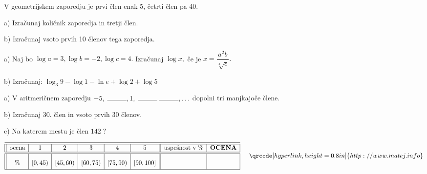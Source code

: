 \documentclass[a4paper,12pt]{letter}
\newcounter{tocke}
\begin{document}


\newpage
\def\tocke6{4+4}
\begin{naloga}[\hfill \quad $\tocke6$
\qquad \rightsquigarrow \vert a.\qquad| b.\qquad| c.\qquad| ] \addtocounter{tocke}{\tocke6}
V geometrijskem zaporedju je prvi člen enak 5, četrti člen pa 40. 

a) Izračunaj količnik zaporedja in tretji člen.

b) Izračunaj vsoto prvih 10 členov tega zaporedja.
\end{naloga}

\vspace{10cm}
\def\tocke6{4+3}
\begin{naloga}[\hfill \quad $\tocke6$
\qquad \rightsquigarrow \vert a.\qquad| b.\qquad| c.\qquad| ] \addtocounter{tocke}{\tocke6}
a) Naj bo $\log a=3, \log b=-2,\log c=4.$ Izračunaj $\log x,$ če je $x=\dfrac{a^2b}{\sqrt[4]{c}}.$

b) Izračunaj: $\log_3 9-\log 1-\ln e+\log 2+\log 5$
\end{naloga}
 



\newpage
\def\tocke3{3+4+3}
\begin{naloga}[\hfill \quad $\tocke3$
\qquad \rightsquigarrow \vert a.\qquad\vert b.\qquad] \addtocounter{tocke}{\tocke3}
a) V aritmeričnem zaporedju $-5,\;\rule{1cm}{0.1mm},1,\;\rule{1cm}{0.1mm}\;\rule{1cm}{0.1mm}, \ldots$ dopolni tri manjkajoče člene.

b) Izračunaj 30. člen in vsoto prvih 30 členov.

c) Na katerem mestu je člen $142\;?$
\end{naloga}



\vfill
{}
\begin{kriterij*}
 $$
 \begin{array}{||c|c|c|c|c|c||
>{}c|c|}
 \hline\hline
 \textup{ocena}& 1&2&3&4&5&\textrm{uspe\v{s}nost v } \%& \textrm{\bf OCENA}\\
  \hline\hline
 \% & [0,45) &[45,60)&[60,75
 ) &[75,90)    &    [90,100]& \mbox{\phantom{ \huge{$\frac{5}{445}$
 15}}
 } 
 & \\
 \hline
 \end{array} \hspace*{0.5cm}\vspace*{-0.3cm} \qrcode[hyperlink,height=0.8in]{http://www.matej.info}
$$
\vspace*{0.1cm}
\end{kriterij*}
\end{document}

